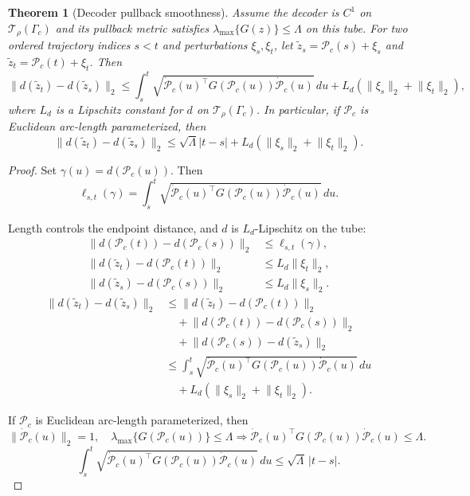 \documentclass[preprint,12pt,number]{elsarticle}
\newtheorem{theorem}{Theorem}
\begin{document}
\begin{theorem}[Decoder pullback smoothness]
	Assume the decoder is $C^1$ on $\mathcal{T}_\rho(\Gamma_c)$ and its pullback metric satisfies $\lambda_{\max}\{G(z)\}\le \Lambda$ on this tube. For two ordered trajectory indices $s<t$ and perturbations $\xi_s,\xi_t$, let $\tilde z_s=\mathcal{P}_c(s)+\xi_s$ and $\tilde z_t=\mathcal{P}_c(t)+\xi_t$. Then
	\[
	\lVert d(\tilde z_t)-d(\tilde z_s)\rVert_2
	\le
	\int_s^t \sqrt{\dot{\mathcal{P}}_c(u)^\top G(\mathcal{P}_c(u))\dot{\mathcal{P}}_c(u)}\,du
	+L_d(\lVert\xi_s\rVert_2+\lVert\xi_t\rVert_2),
	\]
	where $L_d$ is a Lipschitz constant for $d$ on $\mathcal{T}_\rho(\Gamma_c)$. In particular, if $\mathcal{P}_c$ is Euclidean arc-length parameterized, then
	\[
	\lVert d(\tilde z_t)-d(\tilde z_s)\rVert_2
	\le \sqrt{\Lambda}|t-s|+L_d(\lVert\xi_s\rVert_2+\lVert\xi_t\rVert_2).
	\]
\end{theorem}

\begin{proof}
	Set $\gamma(u)=d(\mathcal{P}_c(u))$. Then
	\[
	\ell_{s,t}(\gamma)
	=
	\int_s^t
	\sqrt{\dot{\mathcal{P}}_c(u)^\top G(\mathcal{P}_c(u))\dot{\mathcal{P}}_c(u)}\,du .
	\]

	Length controls the endpoint distance, and $d$ is $L_d$-Lipschitz on the tube:
	\[
	\begin{aligned}
	\lVert d(\mathcal{P}_c(t))-d(\mathcal{P}_c(s))\rVert_2
	&\le \ell_{s,t}(\gamma),\\
	\lVert d(\tilde z_t)-d(\mathcal{P}_c(t))\rVert_2
	&\le L_d\lVert\xi_t\rVert_2,\\
	\lVert d(\tilde z_s)-d(\mathcal{P}_c(s))\rVert_2
	&\le L_d\lVert\xi_s\rVert_2 .
	\end{aligned}
	\]
	\[
	\begin{aligned}
	\lVert d(\tilde z_t)-d(\tilde z_s)\rVert_2
	&\le
	\lVert d(\tilde z_t)-d(\mathcal{P}_c(t))\rVert_2\\
	&\quad+
	\lVert d(\mathcal{P}_c(t))-d(\mathcal{P}_c(s))\rVert_2\\
	&\quad+
	\lVert d(\mathcal{P}_c(s))-d(\tilde z_s)\rVert_2\\
	&\le
	\int_s^t
	\sqrt{\dot{\mathcal{P}}_c(u)^\top G(\mathcal{P}_c(u))\dot{\mathcal{P}}_c(u)}\,du\\
	&\quad+
	L_d(\lVert\xi_s\rVert_2+\lVert\xi_t\rVert_2).
	\end{aligned}
	\]

	If $\mathcal{P}_c$ is Euclidean arc-length parameterized, then
	\[
	\lVert\dot{\mathcal{P}}_c(u)\rVert_2=1,\quad
	\lambda_{\max}\{G(\mathcal{P}_c(u))\}\le\Lambda
	\Longrightarrow
	\dot{\mathcal{P}}_c(u)^\top G(\mathcal{P}_c(u))\dot{\mathcal{P}}_c(u)
	\le\Lambda .
	\]
	\[
	\int_s^t
	\sqrt{\dot{\mathcal{P}}_c(u)^\top G(\mathcal{P}_c(u))\dot{\mathcal{P}}_c(u)}\,du
	\le
	\sqrt{\Lambda}\,|t-s|.
	\]
\end{proof}
\end{document}
